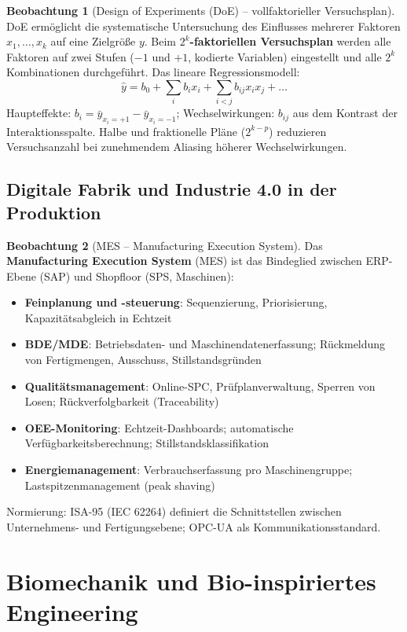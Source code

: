 ﻿\documentclass[a4paper,12pt]{report}
\theoremstyle{definition}
\newtheorem{beobachtung}{Beobachtung}
\begin{document}
\begin{beobachtung}[Design of Experiments (DoE) -- vollfaktorieller Versuchsplan]
DoE ermöglicht die systematische Untersuchung des Einflusses mehrerer
Faktoren $x_1, \ldots, x_k$ auf eine Zielgröße $y$.
Beim \textbf{$2^k$-faktoriellen Versuchsplan} werden alle Faktoren
auf zwei Stufen ($-1$ und $+1$, kodierte Variablen) eingestellt
und alle $2^k$ Kombinationen durchgeführt.
Das lineare Regressionsmodell:
\[
  \hat{y} = b_0 + \sum_i b_i x_i + \sum_{i<j} b_{ij}x_ix_j + \ldots
\]
Haupteffekte: $b_i = \bar{y}_{x_i=+1} - \bar{y}_{x_i=-1}$;
Wechselwirkungen: $b_{ij}$ aus dem Kontrast der Interaktionsspalte.
Halbe und fraktionelle Pläne ($2^{k-p}$) reduzieren Versuchsanzahl
bei zunehmendem Aliasing höherer Wechselwirkungen.
\end{beobachtung}

\section{Digitale Fabrik und Industrie 4.0 in der Produktion}

\begin{beobachtung}[MES -- Manufacturing Execution System]
Das \textbf{Manufacturing Execution System} (MES) ist das Bindeglied
zwischen ERP-Ebene (SAP) und Shopfloor (SPS, Maschinen):
\begin{itemize}
    \item[-] \textbf{Feinplanung und -steuerung}: Sequenzierung, Priorisierung,
          Kapazitätsabgleich in Echtzeit
    \item[-] \textbf{BDE/MDE}: Betriebsdaten- und Maschinendatenerfassung;
          Rückmeldung von Fertigmengen, Ausschuss, Stillstandsgründen
    \item[-] \textbf{Qualitätsmanagement}: Online-SPC, Prüfplanverwaltung,
          Sperren von Losen; Rückverfolgbarkeit (Traceability)
    \item[-] \textbf{OEE-Monitoring}: Echtzeit-Dashboards; automatische
          Verfügbarkeitsberechnung; Stillstandsklassifikation
    \item[-] \textbf{Energiemanagement}: Verbrauchserfassung pro Maschinengruppe;
          Lastspitzenmanagement (peak shaving)
\end{itemize}
Normierung: ISA-95 (IEC 62264) definiert die Schnittstellen zwischen
Unternehmens- und Fertigungsebene; OPC-UA als Kommunikationsstandard.
\end{beobachtung}

\chapter{Biomechanik und Bio-inspiriertes Engineering}
\end{document}
